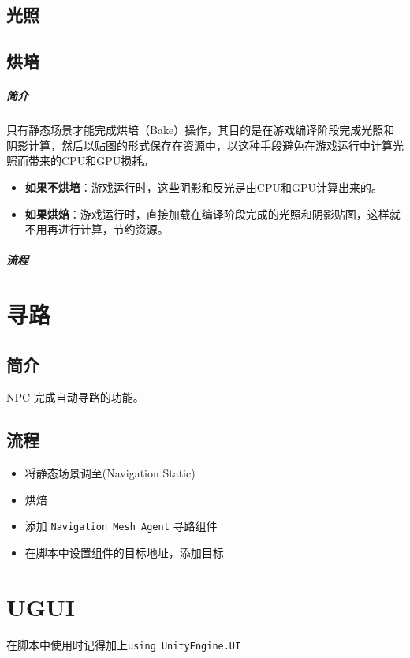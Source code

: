 \documentclass[UTF8,a4paper,12pt]{ctexbook}
\begin{document}
	\section{光照}
		
	\section{烘培}
		\paragraph{简介}
			只有静态场景才能完成烘培（Bake）操作，其目的是在游戏编译阶段完成光照和阴影计算，然后以贴图的形式保存在资源中，以这种手段避免在游戏运行中计算光照而带来的CPU和GPU损耗。
			
			\begin{itemize}
				\item \textbf{如果不烘培}：游戏运行时，这些阴影和反光是由CPU和GPU计算出来的。
				\item \textbf{如果烘焙}：游戏运行时，直接加载在编译阶段完成的光照和阴影贴图，这样就不用再进行计算，节约资源。
			\end{itemize}
		
		\paragraph{流程}
	
	
\chapter{寻路}
	\section{简介}
		NPC 完成自动寻路的功能。
		
	\section{流程}
		\begin{itemize}
			\item 将静态场景调至(Navigation Static)
			\item 烘焙
			\item 添加 \verb|Navigation Mesh Agent| 寻路组件
			\item 在脚本中设置组件的目标地址，添加目标
		\end{itemize}
	
\chapter{UGUI}
	在脚本中使用时记得加上\verb|using UnityEngine.UI |
	
\end{document}
